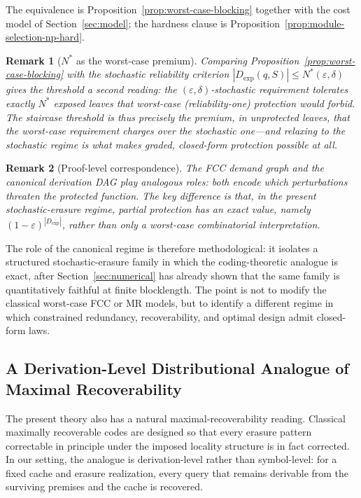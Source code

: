 \documentclass[journal]{IEEEtran}
\makeatletter
\newtheorem{remark}{Remark}[section]
\numberwithin{equation}{section}
\renewenvironment{proof}[1][\proofname]{\par
  \pushQED{\qed}%
  \normalfont \topsep6\p@\@plus6\p@\relax
  \trivlist
  \item[\hskip\labelsep
        \itshape
    #1\@addpunct{.}]\ignorespaces
}{%
  \popQED\endtrivlist\@endpefalse
}
\makeatother
\begin{document}
\begin{proof}
The equivalence is Proposition~\ref{prop:worst-case-blocking} together
with the cost model of Section~\ref{sec:model}; the hardness clause is
Proposition~\ref{prop:module-selection-np-hard}.
\end{proof}

\begin{remark}[\(N^{*}\) as the worst-case premium]
\label{rem:nstar-premium}
Comparing Proposition~\ref{prop:worst-case-blocking} with the stochastic
reliability criterion \(|D_{\mathrm{exp}}(q,S)|\le
N^{*}(\varepsilon,\delta)\) gives the threshold a second reading: the
\((\varepsilon,\delta)\)-stochastic requirement tolerates exactly
\(N^{*}\) exposed leaves that worst-case (reliability-one) protection
would forbid.  The staircase threshold is thus precisely the premium, in
unprotected leaves, that the worst-case requirement charges over the
stochastic one---and relaxing to the stochastic regime is what makes
graded, closed-form protection possible at all.
\end{remark}

\begin{remark}[Proof-level correspondence]
\label{rem:proof-objects}
The FCC demand graph and the canonical derivation DAG play analogous roles:
both encode which perturbations threaten the protected function.  The key
difference is that, in the present stochastic-erasure regime, partial
protection has an exact value, namely
\((1-\varepsilon)^{|D_{\mathrm{exp}}|}\), rather than only a worst-case
combinatorial interpretation.
\end{remark}

The role of the canonical regime is therefore methodological: it isolates a
structured stochastic-erasure family in which the coding-theoretic
analogue is exact, after Section~\ref{sec:numerical} has already shown that
the same family is quantitatively faithful at finite blocklength.
The point is not to modify the classical worst-case FCC
or MR models, but to identify a different regime in which constrained
redundancy, recoverability, and optimal design admit closed-form laws.

\subsection{A Derivation-Level Distributional Analogue of Maximal Recoverability}
\label{subsec:semantic-mr}

The present theory also has a natural maximal-recoverability reading.
Classical maximally recoverable codes are designed so that every erasure
pattern correctable in principle under the imposed locality structure is in
fact corrected.  In our setting, the analogue is derivation-level rather
than symbol-level: for a fixed cache and erasure realization, every query
that remains derivable from the surviving premises and the cache is
recovered.
\end{document}
